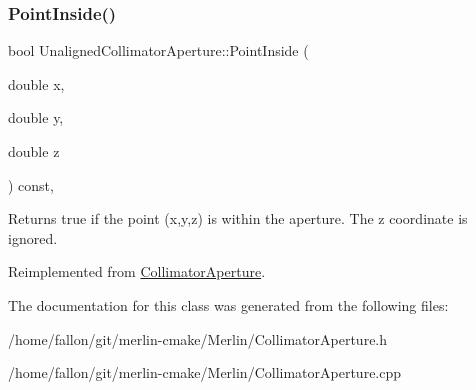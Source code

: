 \subsubsection{\texorpdfstring{Point\+Inside()}{PointInside()}}
{\footnotesize\ttfamily bool Unaligned\+Collimator\+Aperture\+::\+Point\+Inside (\begin{DoxyParamCaption}\item[{double}]{x,  }\item[{double}]{y,  }\item[{double}]{z }\end{DoxyParamCaption}) const\hspace{0.3cm}{\ttfamily [inline]}, {\ttfamily [virtual]}}

Returns true if the point (x,y,z) is within the aperture. The z coordinate is ignored. 

Reimplemented from \hyperlink{classCollimatorAperture_a964f63287a0ab48900859d75dfa644dc}{Collimator\+Aperture}.



The documentation for this class was generated from the following files\+:\begin{DoxyCompactItemize}
\item 
/home/fallon/git/merlin-\/cmake/\+Merlin/Collimator\+Aperture.\+h\item 
/home/fallon/git/merlin-\/cmake/\+Merlin/Collimator\+Aperture.\+cpp\end{DoxyCompactItemize}
